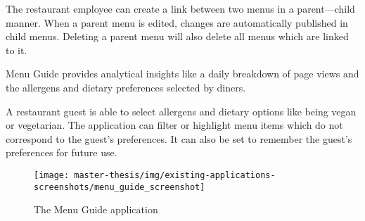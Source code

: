   The restaurant employee can create a link between two menus in a parent---child manner.
  When a parent menu is edited, changes are automatically published in child menus.
  Deleting a parent menu will also delete all menus which are linked to it.

  Menu Guide provides analytical insights like a daily breakdown of page views and the allergens and dietary preferences selected by diners.

  A restaurant guest is able to select allergens and dietary options like being vegan or vegetarian.
  The application can filter or highlight menu items which do not correspond to the guest's preferences.
  It can also be set to remember the guest's preferences for future use.

  \begin{figure}[h]
    \centering
    \texttt{[image: master-thesis/img/existing-applications-screenshots/menu\_guide\_screenshot]}
    \caption{The Menu Guide application}
  \end{figure}


